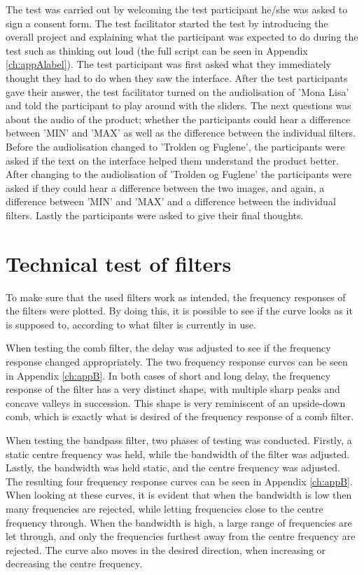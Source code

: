 The test was carried out by welcoming the test participant he/she was asked to sign a consent form. The test facilitator started the test by introducing the overall project and explaining what the participant was expected to do during the test such as thinking out loud (the full script can be seen in Appendix \ref{ch:appAlabel}). The test participant was first asked what they immediately thought they had to do when they saw the interface. After the test participants gave their answer, the test facilitator turned on the audiolisation of 'Mona Lisa' and told the participant to play around with the sliders. The next questions was about the audio of the product; whether the participants could hear a difference between 'MIN' and 'MAX' as well as the difference between the individual filters. Before the audiolisation changed to 'Trolden og Fuglene', the participants were asked if the text on the interface helped them understand the product better. 
After changing to the audiolisation of 'Trolden og Fuglene' the participants were asked if they could hear a difference between the two images, and again, a difference between 'MIN' and 'MAX' and a difference between the individual filters. Lastly the participants were asked to give their final thoughts.

\section{Technical test of filters}
To make sure that the used filters work as intended, the frequency responses of the filters were plotted. By doing this, it is possible to see if the curve looks as it is supposed to, according to what filter is currently in use.

When testing the comb filter, the delay was adjusted to see if the frequency response changed appropriately. The two frequency response curves can be seen in Appendix \ref{ch:appB}. In both cases of short and long delay, the frequency response of the filter has a very distinct shape, with multiple sharp peaks and concave valleys in succession. This shape is very reminiscent of an upside-down comb, which is exactly what is desired of the frequency response of a comb filter.

When testing the bandpass filter, two phases of testing was conducted. Firstly, a static centre frequency was held, while the bandwidth of the filter was adjusted. Lastly, the bandwidth was held static, and the centre frequency was adjusted. The resulting four frequency response curves can be seen in Appendix \ref{ch:appB}. When looking at these curves, it is evident that when the bandwidth is low then many frequencies are rejected, while letting frequencies close to the centre frequency through. When the bandwidth is high, a large range of frequencies are let through, and only the frequencies furthest away from the centre frequency are rejected. The curve also moves in the desired direction, when increasing or decreasing the centre frequency.

